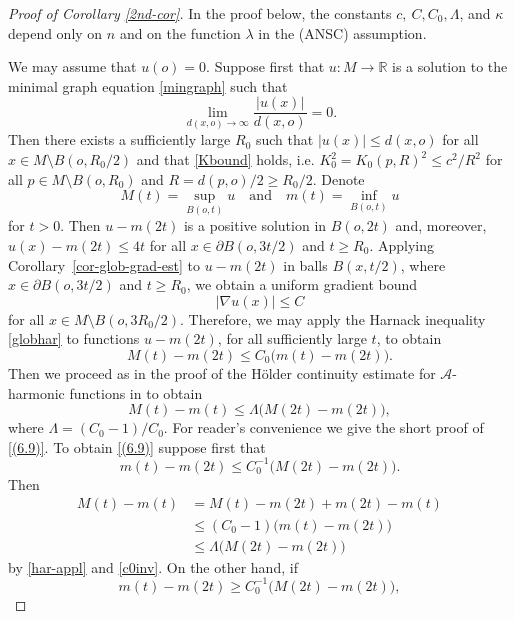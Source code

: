 \documentclass[10pt,a4paper,reqno]{amsart}
\newcommand{\R}{\mathbb{R}}
\numberwithin{equation}{section}
\theoremstyle{plain}
\theoremstyle{definition}
\begin{document}
\begin{proof}[Proof of Corollary \ref{2nd-cor}] 
In the proof below, the constants $c,\ C, C_0, \Lambda$, and $\kappa$ depend only on $n$ and on the function
$\lambda$ in the (ANSC) assumption.

We may assume that $u(o)=0$. 
Suppose first that $u\colon M\to\R$ is a solution to the minimal graph equation \eqref{mingraph} such that
\begin{equation}\label{alkuehto}
\lim_{d(x,o)\to\infty}\frac{|u(x)|}{d(x,o)}=0.
\end{equation}
Then there exists a sufficiently large $R_0$ such that 
$|u(x)|\le d(x,o)$ for all $x\in M\setminus B(o,R_0/2)$ and that \eqref{Kbound} holds, i.e. $K_0^2=K_0(p,R)^2\le c^2/R^2$
for all $p\in M\setminus B(o,R_0)$ and $R=d(p,o)/2\ge R_0/2$.
Denote
\[
M(t)=\sup_{B(o,t)}u\quad\text{and}\quad
m(t)=\inf_{B(o,t)}u
\]
for $t>0$. Then $u-m(2t)$ is a positive solution in $B(o,2t)$ and, moreover, $u(x)-m(2t)\le 4t$ for all $x\in \partial B(o,3t/2)$
and $t\ge R_0$. Applying  
Corollary~\ref{cor-glob-grad-est} 
to $u-m(2t)$ in balls $B(x,t/2)$, where $x\in\partial B(o,3t/2)$ and $t\ge R_0$,
we obtain a uniform gradient bound
\[
|\nabla u(x)|\le C
\]
for all $x\in M\setminus B(o,3R_0/2)$. Therefore, we may apply the Harnack inequality \eqref{globhar}
to functions $u-m(2t)$, for all sufficiently large $t$, to obtain
\begin{equation}\label{har-appl}
M(t)-m(2t)\le C_0\bigl(m(t)-m(2t)\bigr).
\end{equation}
Then we proceed as in the proof of the H\"older continuity estimate for $\mathcal{A}$-harmonic functions in \cite[6.6. Theorem]{HKM} to obtain 
\begin{equation}\label{(6.9)}
M(t)-m(t)\le\Lambda\bigl(M(2t)-m(2t)\bigr),
\end{equation}
where $\Lambda=(C_0-1)/C_0$. For reader's convenience we give the short proof of  
\eqref{(6.9)}. To obtain \eqref{(6.9)} suppose first that 
\begin{equation}\label{c0inv}
m(t)-m(2t)\le C_0^{-1}\bigl(M(2t)-m(2t)\bigr).
\end{equation}
Then 
\begin{align*}
M(t)-m(t) & = M(t)-m(2t)+m(2t)-m(t)\\
&\le (C_0-1)\bigl(m(t)-m(2t)\bigr)\\
&\le \Lambda\bigl(M(2t)-m(2t)\bigr)
\end{align*}
by \eqref{har-appl} and \eqref{c0inv}.
On the other hand, if 
\[
m(t)-m(2t)\ge C_0^{-1}\bigl(M(2t)-m(2t)\bigr),
\]
\end{proof}
\end{document}
